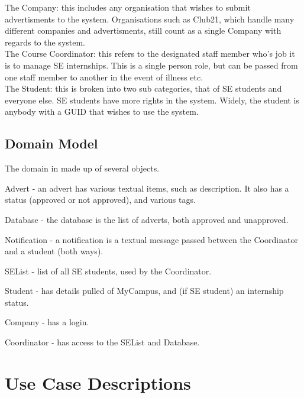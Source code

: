 \documentclass{l3deliverable}
\begin{document}
The Company: this includes any organisation that wishes to submit 
advertisments to the system. Organisations such as Club21, which handle
many different companies and advertisments, still count as a single Company
with regards to the system.\\

The Course Coordinator: this refers to the designated staff member who's job
it is to manage SE internships. This is a single person role, but can be 
passed from one staff member to another in the event of illness etc.\\

The Student: this is broken into two sub categories, that of SE students and
everyone else. SE students have more rights in the system. Widely, the student
is anybody with a GUID that wishes to use the system.\\


\subsection{Domain Model}


The domain in made up of several objects.

Advert - an advert has various textual items, such as description. It also
has a status (approved or not approved), and various tags.

Database - the database is the list of adverts, both approved and unapproved.

Notification - a notification is a textual message passed between the 
Coordinator and a student (both ways).

SEList - list of all SE students, used by the Coordinator. 

Student - has details pulled of MyCampus, and (if SE student) an internship 
status.

Company - has a login.

Coordinator - has access to the SEList and Database.


\section{Use Case Descriptions}

\end{document}
